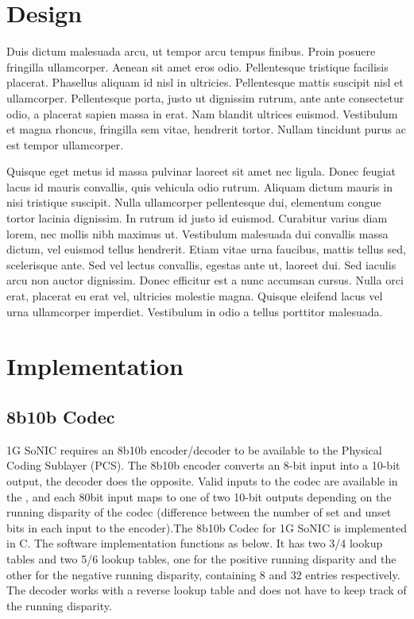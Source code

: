 \documentclass[conference]{IEEEtran}
\begin{document}
\section{Design}

Duis dictum malesuada arcu, ut tempor arcu tempus finibus. Proin posuere fringilla ullamcorper. Aenean sit amet eros odio. Pellentesque tristique facilisis placerat. Phasellus aliquam id nisl in ultricies. Pellentesque mattis suscipit nisl et ullamcorper. Pellentesque porta, justo ut dignissim rutrum, ante ante consectetur odio, a placerat sapien massa in erat. Nam blandit ultrices euismod. Vestibulum et magna rhoncus, fringilla sem vitae, hendrerit tortor. Nullam tincidunt purus ac est tempor ullamcorper.

Quisque eget metus id massa pulvinar laoreet sit amet nec ligula. Donec feugiat lacus id mauris convallis, quis vehicula odio rutrum. Aliquam dictum mauris in nisi tristique suscipit. Nulla ullamcorper pellentesque dui, elementum congue tortor lacinia dignissim. In rutrum id justo id euismod. Curabitur varius diam lorem, nec mollis nibh maximus ut. Vestibulum malesuada dui convallis massa dictum, vel euismod tellus hendrerit. Etiam vitae urna faucibus, mattis tellus sed, scelerisque ante. Sed vel lectus convallis, egestas ante ut, laoreet dui. Sed iaculis arcu non auctor dignissim. Donec efficitur est a nunc accumsan cursus. Nulla orci erat, placerat eu erat vel, ultricies molestie magna. Quisque eleifend lacus vel urna ullamcorper imperdiet. Vestibulum in odio a tellus porttitor malesuada.

\section{Implementation}

\subsection{8b10b Codec}

1G SoNIC requires an 8b10b encoder/decoder to be available to the Physical Coding Sublayer (PCS). The 8b10b encoder converts an 8-bit input into a 10-bit output, the decoder does the opposite. Valid inputs to the codec are available in the \cite{ieee8023}, and each 80bit input maps to one of two 10-bit outputs depending on the running disparity of the codec (difference between the number of set and unset bits in each input to the encoder).The 8b10b Codec for 1G SoNIC is implemented in C. The software implementation functions as below. It has two 3/4 lookup tables and two 5/6 lookup tables, one for the positive running disparity and the other for the negative running disparity, containing 8 and 32 entries respectively. The decoder works with a reverse lookup table and does not have to keep track of the running disparity.
\end{document}
